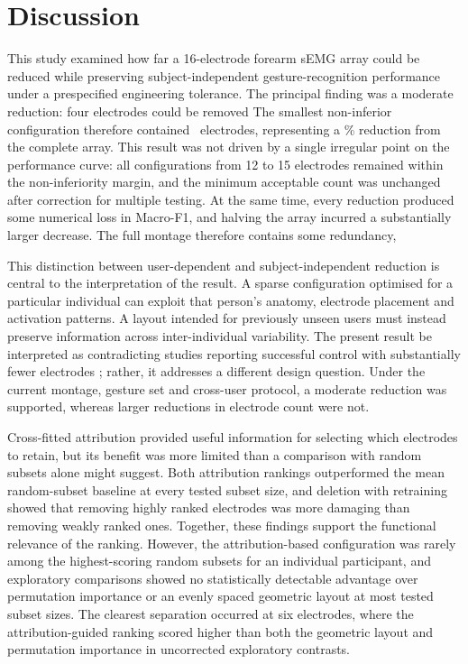 \section{Discussion}
\label{sec:discussion}

This study examined how far a 16-electrode forearm sEMG array could be reduced while preserving subject-independent gesture-recognition performance under a prespecified engineering tolerance. The principal finding was a moderate reduction: four electrodes could be removed  The smallest non-inferior configuration therefore contained \KStar\ electrodes, representing a \KStarReductionPct\% reduction from the complete array. This result was not driven by a single irregular point on the performance curve: all configurations from 12 to 15 electrodes remained within the non-inferiority margin, and the minimum acceptable count was unchanged after correction for multiple testing. At the same time, every reduction produced some numerical loss in Macro-F1, and halving the array incurred a substantially larger decrease. The full montage therefore contains some redundancy, 

This distinction between user-dependent and subject-independent reduction is central to the interpretation of the result. A sparse configuration optimised for a particular individual can exploit that person's anatomy, electrode placement and activation patterns. A layout intended for previously unseen users must instead preserve information across inter-individual variability. The present result  be interpreted as contradicting studies reporting successful control with substantially fewer electrodes \citep{phinyomark2018emg,qu2021reduce}; rather, it addresses a different design question. Under the current montage, gesture set and cross-user protocol, a moderate reduction was supported, whereas larger reductions in electrode count were not.

Cross-fitted attribution provided useful information for selecting which electrodes to retain, but its benefit was more limited than a comparison with random subsets alone might suggest. Both attribution rankings outperformed the mean random-subset baseline at every tested subset size, and deletion with retraining showed that removing highly ranked electrodes was more damaging than removing weakly ranked ones. Together, these findings support the functional relevance of the ranking. However, the attribution-based configuration was rarely among the highest-scoring random subsets for an individual participant, and exploratory comparisons showed no statistically detectable advantage over permutation importance or an evenly spaced geometric layout at most tested subset sizes. The clearest separation occurred at six electrodes, where the attribution-guided ranking scored higher than both the geometric layout and permutation importance in uncorrected exploratory contrasts.

